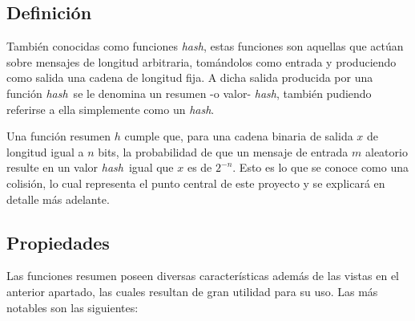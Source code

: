 \documentclass[12pt,spanish,listoffigures,listoftables,listofalgorithms]{tfgetsinf}
\newcommand{\hash}{\textit{hash}}
\begin{document}
\subsection{Definición}

También conocidas como funciones \hash, estas funciones son aquellas que actúan sobre mensajes de longitud arbitraria, tomándolos como entrada y produciendo como salida una cadena de longitud fija. A dicha salida producida por una función \hash~se le denomina un resumen -o valor- \hash, también pudiendo referirse a ella simplemente como un \hash.

Una función resumen $h$ cumple que, para una cadena binaria de salida $x$ de longitud igual a $n$ bits, la probabilidad de que un mensaje de entrada $m$ aleatorio resulte en un valor \hash~igual que $x$ es de $2^{-n}$. Esto es lo que se conoce como una colisión, lo cual representa el punto central de este proyecto y se explicará en detalle más adelante.






\subsection{Propiedades}\label{props}

Las funciones resumen poseen diversas características además de las vistas en el anterior apartado, las cuales resultan de gran utilidad para su uso. Las más notables son las siguientes:
\end{document}
